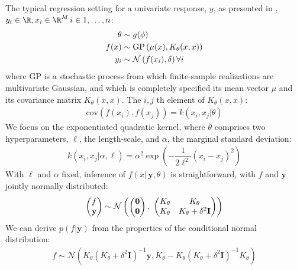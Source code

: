 \documentclass{article}
\newcommand{\lp}{\ensuremath{\left(}}
\newcommand{\rp}{\ensuremath{\right)}}
\begin{document}
The typical regression setting for a univariate response, $y$, as presented in \citet{flaxman2015fast},
$y_i \in \R, x_i \in \R^M\, i \in {1,\dots,n}$:
\begin{align*}
  \theta & \sim g(\phi) \\
  f(x) & \sim \text{GP}\lp \mu(x),
  K_\theta(x, x) \rp \\
  y_i & \sim \mathcal{N}\lp f(x_i), \delta \rp \forall i \\
\end{align*}
where $\text{GP}$ is a stochastic process from which finite-sample realizations are
multivariate Gaussian, and which is completely specified its mean vector $\mu$
and its covariance matrix $K_\theta(x, x)$. The $i, j$ th
element of $K_\theta(x, x)$:
\begin{align*}
  \text{cov}(f(x_i), f(x_j)) = k(x_i, x_j | \theta) 
\end{align*}
We focus on the exponentiated quadratic kernel, where $\theta$ comprises
two hyperparameters, $\ell$, the length-scale, and $\alpha$, the marginal
standard deviation:
\begin{align} \label{kern}
  k(x_i, x_j | \alpha, \ell) = \alpha^2 
\exp \left(
	- \dfrac{1}{2\ell^2} (x_{i} - x_{j})^2
\right)
\end{align}
With $\ell$ and $\alpha$ fixed, inference of $f(x | \, \mathbf{y}, \theta)$ is
straightforward, with $f$ and $\mathbf{y}$ jointly normally distributed:
\begin{align*} \begin{pmatrix} f\\ \mathbf{y} \\ \end{pmatrix} \sim
\mathcal{N} \lp \begin{pmatrix} \mathbf{0} \\ \mathbf{0} \end{pmatrix} ,\,\,
  \begin{pmatrix} K_\theta &
  K_\theta  \\ K_\theta &
  K_\theta + \delta ^ 2 \mathbf{I}\\ \end{pmatrix} \rp
\end{align*}
We can derive $p(f | \mathbf{y})$ from the properties of the conditional normal
distribution: 
\begin{align*}
  f \sim
  \mathcal{N}(K_\theta  (K_\theta + \delta ^ 2 \mathbf{I})^{-1}\mathbf{y},  
  K_\theta - K_\theta (K_\theta + \delta ^ 2 \mathbf{I})^{-1}K_\theta)
\end{align*}
\end{document}
